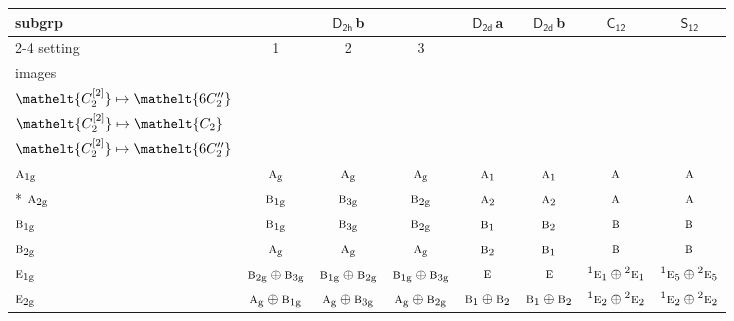 \documentclass[10pt,a4paper]{article}
\numberwithin{equation}{section}
\newcommand{\eltfont}[1]{{\let\sigma\eltsigma\mathelt{#1}}}
\newcommand{\grp}[1]{\mathsf{#1}}
\newcommand{\irr}[1]{\text{\normalfont\scshape #1}}
\newcommand{\conjpair}[1]{{}^{#1}}
\newcommand{\cls}[1]{\eltfont{#1}}
\newcommand{\ptag}[1]{\mathrm{#1}}
\newcommand{\clsletter}[1]{\,{\scriptsize\color{black!55}#1}}
\newcommand{\genidx}[2]{#1^{[\mathrm{#2}]}}
\begin{document}
{\small\begin{longtable}{@{}lccccccc@{}}\toprule
subgrp & \multicolumn{3}{c}{\href{D2h.pdf}{$\grp{D_{2h}}$}\clsletter{b}} & \href{D2d.pdf}{$\grp{D_{2d}}$}\clsletter{a} & \href{D2d.pdf}{$\grp{D_{2d}}$}\clsletter{b} & \href{C12.pdf}{$\grp{C_{12}}$} & \href{S12.pdf}{$\grp{S_{12}}$}\\\cmidrule(lr){2-4}
setting & 1 & 2 & 3 &  &  &  & \\
images & {\scriptsize\begin{tabular}[t]{@{}c@{}}$\cls{\genidx{C_{2}}{1}} \mapsto \cls{C_{2}}$\\$\cls{\genidx{C_{2}}{2}} \mapsto \cls{6C_{2}''}$\end{tabular}} & {\scriptsize\begin{tabular}[t]{@{}c@{}}$\cls{\genidx{C_{2}}{1}} \mapsto \cls{6C_{2}''}$\\$\cls{\genidx{C_{2}}{2}} \mapsto \cls{C_{2}}$\end{tabular}} & {\scriptsize\begin{tabular}[t]{@{}c@{}}$\cls{\genidx{C_{2}}{1}} \mapsto \cls{6C_{2}''}$\\$\cls{\genidx{C_{2}}{2}} \mapsto \cls{6C_{2}''}$\end{tabular}} &  &  &  & \\\midrule\endhead
\bottomrule\endfoot\endlastfoot
$\irr{a}_{1\ptag{g}}$ & $\irr{a}_{\ptag{g}}$ & $\irr{a}_{\ptag{g}}$ & $\irr{a}_{\ptag{g}}$ & $\irr{a}_{1}$ & $\irr{a}_{1}$ & $\irr{a}$ & $\irr{a}$\\*
$\irr{a}_{2\ptag{g}}$ & $\irr{b}_{1\ptag{g}}$ & $\irr{b}_{3\ptag{g}}$ & $\irr{b}_{2\ptag{g}}$ & $\irr{a}_{2}$ & $\irr{a}_{2}$ & $\irr{a}$ & $\irr{a}$\\
$\irr{b}_{1\ptag{g}}$ & $\irr{b}_{1\ptag{g}}$ & $\irr{b}_{3\ptag{g}}$ & $\irr{b}_{2\ptag{g}}$ & $\irr{b}_{1}$ & $\irr{b}_{2}$ & $\irr{b}$ & $\irr{b}$\\
$\irr{b}_{2\ptag{g}}$ & $\irr{a}_{\ptag{g}}$ & $\irr{a}_{\ptag{g}}$ & $\irr{a}_{\ptag{g}}$ & $\irr{b}_{2}$ & $\irr{b}_{1}$ & $\irr{b}$ & $\irr{b}$\\
$\irr{e}_{1\ptag{g}}$ & $\irr{b}_{2\ptag{g}}\oplus \irr{b}_{3\ptag{g}}$ & $\irr{b}_{1\ptag{g}}\oplus \irr{b}_{2\ptag{g}}$ & $\irr{b}_{1\ptag{g}}\oplus \irr{b}_{3\ptag{g}}$ & $\irr{e}$ & $\irr{e}$ & $\conjpair{1}\irr{e}_{1}\oplus \conjpair{2}\irr{e}_{1}$ & $\conjpair{1}\irr{e}_{5}\oplus \conjpair{2}\irr{e}_{5}$\\
$\irr{e}_{2\ptag{g}}$ & $\irr{a}_{\ptag{g}}\oplus \irr{b}_{1\ptag{g}}$ & $\irr{a}_{\ptag{g}}\oplus \irr{b}_{3\ptag{g}}$ & $\irr{a}_{\ptag{g}}\oplus \irr{b}_{2\ptag{g}}$ & $\irr{b}_{1}\oplus \irr{b}_{2}$ & $\irr{b}_{1}\oplus \irr{b}_{2}$ & $\conjpair{1}\irr{e}_{2}\oplus \conjpair{2}\irr{e}_{2}$ & $\conjpair{1}\irr{e}_{2}\oplus \conjpair{2}\irr{e}_{2}$\\

\end{longtable}}
\end{document}
